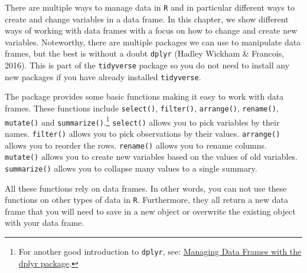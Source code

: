 \documentclass[12pt,oneside]{reedthesis}
\theoremstyle{definition}
\theoremstyle{definition}
\theoremstyle{definition}
\theoremstyle{remark}
\begin{document}
  There are multiple ways to manage data in \texttt{R} and in particular
  different ways to create and change variables in a data frame. In this
  chapter, we show different ways of working with data frames with a focus
  on how to change and create new variables. Noteworthy, there are
  multiple packages we can use to manipulate data frames, but the best is
  without a doubt \texttt{dplyr} (Hadley Wickham \& Francois, 2016). This
  is part of the \texttt{tidyverse} package so you do not need to install
  any new packages if you have already installed \texttt{tidyverse}.
  
  The package provides some basic functions making it easy to work with
  data frames. These functions include \texttt{select()},
  \texttt{filter()}, \texttt{arrange()}, \texttt{rename()},
  \texttt{mutate()} and \texttt{summarize()}.\footnote{For another good
    introduction to \texttt{dplyr}, see:
    \href{https://bookdown.org/rdpeng/rprogdatascience/managing-data-frames-with-the-dplyr-package.html}{Managing
    Data Frames with the dplyr package}.} \texttt{select()} allows you to
  pick variables by their names. \texttt{filter()} allows you to pick
  observations by their values. \texttt{arrange()} allows you to reorder
  the rows. \texttt{rename()} allows you to rename columns.
  \texttt{mutate()} allows you to create new variables based on the values
  of old variables. \texttt{summarize()} allows you to collapse many
  values to a single summary.
  
  All these functions rely on data frames. In other words, you can not use
  these functions on other types of data in \texttt{R}. Furthermore, they
  all return a new data frame that you will need to save in a new object
  or overwrite the existing object with your data frame.
  
\end{document}
